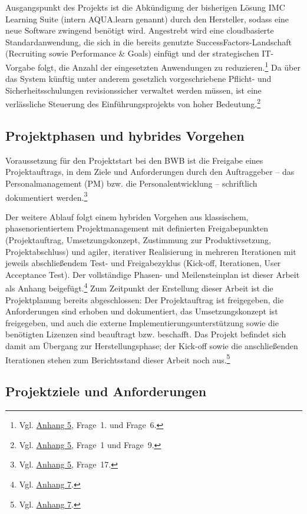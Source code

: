 \documentclass[
    12pt, 
    a4paper,
    ]{scrartcl} %
\begin{document}
Ausgangspunkt des Projekts ist die Abkündigung der bisherigen Lösung IMC Learning Suite (intern AQUA.learn genannt) durch den Hersteller, sodass eine neue Software zwingend benötigt wird. Angestrebt wird eine cloudbasierte Standardanwendung, die sich in die bereits genutzte SuccessFactors-Landschaft (Recruiting sowie Performance \& Goals) einfügt und der strategischen IT-Vorgabe folgt, die Anzahl der eingesetzten Anwendungen zu reduzieren.\footnote{Vgl. \hyperref[sec:Anhang5]{Anhang 5}, Frage~1. und Frage~6.} Da über das System künftig unter anderem gesetzlich vorgeschriebene Pflicht- und Sicherheitsschulungen revisionssicher verwaltet werden müssen, ist eine verlässliche Steuerung des Einführungsprojekts von hoher Bedeutung.\footnote{Vgl. \hyperref[sec:Anhang5]{Anhang 5}, Frage~1 und Frage~9.}

\subsection{Projektphasen und hybrides Vorgehen}

Voraussetzung für den Projektstart bei den BWB ist die Freigabe eines Projektauftrags, in dem Ziele und Anforderungen durch den Auftraggeber -- das Personalmanagement (PM) bzw. die Personalentwicklung -- schriftlich dokumentiert werden.\footnote{Vgl. \hyperref[sec:Anhang5]{Anhang 5}, Frage~17.}

Der weitere Ablauf folgt einem hybriden Vorgehen aus klassischem, phasenorientiertem Projektmanagement mit definierten Freigabepunkten (Projektauftrag, Umsetzungskonzept, Zustimmung zur Produktivsetzung, Projektabschluss) und agiler, iterativer Realisierung in mehreren Iterationen mit jeweils abschließendem Test- und Freigabezyklus (Kick-off, Iterationen, User Acceptance Test). Der vollständige Phasen- und Meilensteinplan ist dieser Arbeit als Anhang beigefügt.\footnote{Vgl. \hyperref[sec:Anhang7]{Anhang 7}.} Zum Zeitpunkt der Erstellung dieser Arbeit ist die Projektplanung bereits abgeschlossen: Der Projektauftrag ist freigegeben, die Anforderungen sind erhoben und dokumentiert, das Umsetzungskonzept ist freigegeben, und auch die externe Implementierungsunterstützung sowie die benötigten Lizenzen sind beauftragt bzw. beschafft. Das Projekt befindet sich damit am Übergang zur Herstellungsphase; der Kick-off sowie die anschließenden Iterationen stehen zum Berichtsstand dieser Arbeit noch aus.\footnote{Vgl. \hyperref[sec:Anhang7]{Anhang 7}.}

\subsection{Projektziele und Anforderungen}
\end{document}
